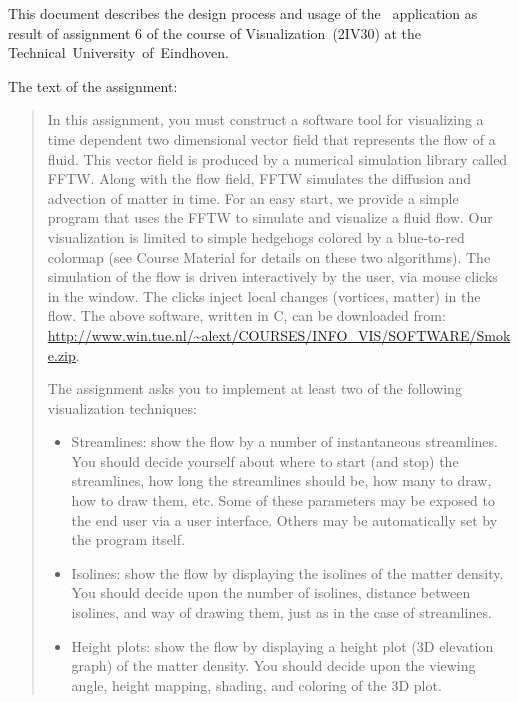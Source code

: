 
This document describes the design process and usage of the \fluids\
application as result of assignment 6 of the course of Visualization~(2IV30) at
the Technical~University~of~Eindhoven.

The text of the assignment:

\begin{quote}

In this assignment, you must construct a software tool for visualizing a time
dependent two dimensional vector field that represents the flow of a fluid.
This vector field is produced by a numerical simulation library called FFTW.
Along with the flow field, FFTW simulates the diffusion and advection of matter
in time. For an easy start, we provide a simple program that uses the FFTW to
simulate and visualize a fluid flow. Our visualization is limited to simple
hedgehogs colored by a blue-to-red colormap (see Course Material for details on
these two algorithms). The simulation of the flow is driven interactively by
the user, via mouse clicks in the window. The clicks inject local changes
(vortices, matter) in the flow.  The above software, written in C, can be
downloaded from:
\url{http://www.win.tue.nl/~alext/COURSES/INFO_VIS/SOFTWARE/Smoke.zip}.

The assignment asks you to implement at least two of the following
visualization techniques: 

\begin{itemize} 

  \item Streamlines: show the flow by a number of instantaneous streamlines.
  You should decide yourself about where to start (and stop) the streamlines,
  how long the streamlines should be, how many to draw, how to draw them,
  etc. Some of these parameters may be exposed to the end user via a user
  interface. Others may be automatically set by the program itself. 


  \item Isolines: show the flow by displaying the isolines of the matter
  density. You should decide upon the number of isolines, distance between
  isolines, and way of drawing them, just as in the case of streamlines. 

  \item Height plots: show the flow by displaying a height plot (3D elevation
  graph) of the matter density. You should decide upon the viewing angle,
  height mapping, shading, and coloring of the 3D plot. 


\end{itemize}
\end{quote}
